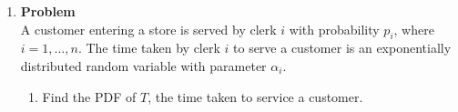 \documentclass[12pt]{article}
\newenvironment{Ex}{\textbf{Problem}\vspace{.75em}\\}{}
\newcommand{\dd}[1]{\:\mathrm{d}{#1}}
\begin{document}
\begin{enumerate}
\begin{Ex}
\begin{solution}
\begin{enumerate}
        is given as
        \begin{equation}
          \label{eq:3b-general-marginal}
          f_Y(y) = \int_{-\infty}^{\infty} f_{X,Y}(x,y) \dd{x}
        \end{equation}
        We will use this to calculate the desired marginal for $Y$.
        \begin{equation}
          \label{eq:3b-sol}
          \begin{aligned}
            f_Y(y) &= \int_{-\infty}^{\infty} f_{X,Y}(x,y) \dd{x} \\
            &= \int_{y}^{2} \frac{1}{2} \dd{x} \\
            &= \left[\frac{x}{2}\right]_y^2 \\
            \implies f_Y(y) &= 1 - \frac{y}{2} \\
          \end{aligned}
        \end{equation}
      \item Calculating the expected value is done by integrating the
        marginal $f_Y(y)$ multiplied by $y$.
        \begin{equation}
          \label{eq:3c-sol}
          \begin{aligned}
            E[Y] &= \int_{-\infty}^{\infty} y f_Y(y) \dd{y} \\
            &= \int_{0}^{2} y(1-\frac{y}{2}) \dd{y} \\
            &= \int_{0}^{2} y-\frac{y^2}{2} \dd{y} \\
            &= \left[\frac{y^2}{2}-\frac{y^3}{6}\right]_{0}^{2}
            \dd{y} \\
            &= 2-\frac{4}{3} \\
            \implies E[Y] &= \frac{2}{3} \\
          \end{aligned}
        \end{equation}
      \end{enumerate}
    \end{solution}
  \end{Ex}
\item
  \begin{Ex}
    A customer entering a store is served by clerk $i$ with
    probability $p_i$, where $i = 1,\ldots,n$. The time taken by clerk
    $i$ to serve a customer is an exponentially distributed random
    variable with parameter $\alpha_i$.
    \begin{enumerate}
    \item Find the PDF of $T$, the time taken to service a customer.

\end{enumerate}
\end{Ex}
\end{enumerate}
\end{document}
